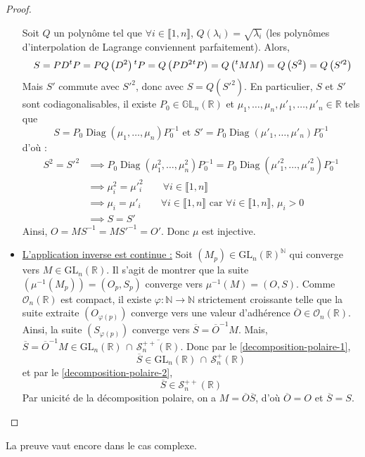 \begin{proof}
\begin{itemize}
			Soit $Q$ un polynôme tel que $\forall i \in \llbracket 1, n \rrbracket$, $Q(\lambda_i) = \sqrt{\lambda_i}$ (les polynômes d'interpolation de Lagrange conviennent parfaitement). Alors,
			\[\ S = PD \mathstrut ^t P = PQ \left(D^2 \right) \mathstrut ^t P = Q \left(PD^2 \mathstrut ^t P \right) = Q \left(\mathstrut ^t M M \right) = Q \left(S^2 \right) = Q \left(S'^2 \right) \]
			Mais $S'$ commute avec $S'^2$, donc avec $S = Q \left(S'^2 \right)$. En particulier, $S$ et $S'$ sont codiagonalisables, il existe $P_0 \in \mathbb{GL}_n(\mathbb{R})$ et $\mu_1, \dots, \mu_n, \mu'_1, \dots, \mu'_n \in \mathbb{R}$ tels que
			\[ S = P_0 \operatorname{Diag}(\mu_1, \dots, \mu_n) P_0^{-1} \text{ et } S' = P_0 \operatorname{Diag} \left (\mu'_1, \dots, \mu'_n \right) P_0^{-1} \]
			d'où :
			\begin{align*}
				S^2 = S'^2 & \implies P_0 \operatorname{Diag} \left(\mu^2_1, \dots, \mu^2_n \right) P_0^{-1} = P_0 \operatorname{Diag} \left (\mu'^2_1, \dots, \mu'^2_n \right) P_0^{-1} \\
				& \implies \mu^2_i = \mu'^2_i \qquad \forall i \in \llbracket 1, n \rrbracket \\
				& \implies \mu_i = \mu'_i \qquad \forall i \in \llbracket 1, n \rrbracket \text{ car } \forall i \in \llbracket 1, n \rrbracket, \, \mu_i > 0 \\
				& \implies S = S'
			\end{align*}
			Ainsi, $O = MS^{-1} = MS'^{-1} = O'$. Donc $\mu$ est injective.
			\item \uline{L'application inverse est continue :} Soit $(M_p) \in \mathrm{GL}_n(\mathbb{R})^{\mathbb{N}}$ qui converge vers $M \in \mathrm{GL}_n(\mathbb{R})$. Il s'agit de montrer que la suite $\left (\mu^{-1} \left (M_p \right) \right) = (O_p, S_p)$ converge vers $\mu^{-1}(M) = (O, S)$. Comme $\mathcal{O}_n(\mathbb{R})$ est compact, il existe $\varphi : \mathbb{N} \rightarrow \mathbb{N}$ strictement croissante telle que la suite extraite $(O_{\varphi(p)})$ converge vers une valeur d'adhérence $\overline{O} \in \mathcal{O}_n(\mathbb{R})$. Ainsi, la suite $(S_{\varphi(p)})$ converge vers $\overline{S} = \overline{O}^{-1} M$.
			\newpar
			Mais, $\overline{S} = \overline{O}^{-1} M \in \mathrm{GL}_n(\mathbb{R}) \, \cap \, \overline{\mathcal{S}_n^{++}(\mathbb{R})}$. Donc par le \cref{decomposition-polaire-1},
			\[ \overline{S} \in \mathrm{GL}_n(\mathbb{R}) \, \cap \, \mathcal{S}_n^{+}(\mathbb{R}) \]
			et par le \cref{decomposition-polaire-2},
			\[ \overline{S} \in \mathcal{S}_n^{++}(\mathbb{R}) \]
			Par unicité de la décomposition polaire, on a $M = \overline{O} \overline{S}$, d'où $\overline{O} = O$ et $\overline{S} = S$.
		\end{itemize}
	\end{proof}

	\begin{remark}
		La preuve vaut encore dans le cas complexe.
	\end{remark}

